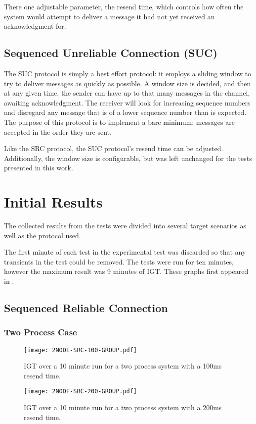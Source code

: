 There one adjustable parameter, the resend time, which controls how often the system would attempt to deliver a message it had not yet received an acknowledgment for.

\subsection{Sequenced Unreliable Connection (SUC)}

The \ac{SUC} protocol is simply a best effort protocol: it employs a sliding window to try to deliver messages as quickly as possible. A window size is decided, and then at any given time, the sender can have up to that many messages in the channel, awaiting acknowledgment. The receiver will look for increasing sequence numbers and disregard any message that is of a lower sequence number than is expected. The purpose of this protocol is to implement a bare minimum: messages are accepted in the order they are sent.

Like the \ac{SRC} protocol, the SUC protocol's resend time can be adjusted. Additionally, the window size is configurable, but was left unchanged for the tests presented in this work.

\section{Initial Results}

The collected results from the tests were divided into several target scenarios as well as the protocol used.

The first minute of each test in the experimental test was discarded so that any transients in the test could be removed.
The tests were run for ten minutes, however the maximum result was 9 minutes of \ac{IGT}.
These graphs first appeared in \cite{CRITIS2012}.

\subsection{Sequenced Reliable Connection}

\subsubsection{Two Process Case}

\begin{figure}
\centering
\begin{minipage}{0.45\textwidth}
    \centering
    \texttt{[image: 2NODE-SRC-100-GROUP.pdf]}
    \caption{\ac{IGT} over a 10 minute run for a two process system with a 100ms resend time.}
    \label{fig:IGT-SRC-2NODE-100}
\end{minipage}%
\qquad
\begin{minipage}{0.45\textwidth}
    \centering
    \texttt{[image: 2NODE-SRC-200-GROUP.pdf]}
    \caption{\ac{IGT} over a 10 minute run for a two process system with a 200ms resend time.}
    \label{fig:IGT-SRC-2NODE-200}
\end{minipage}
\end{figure}

